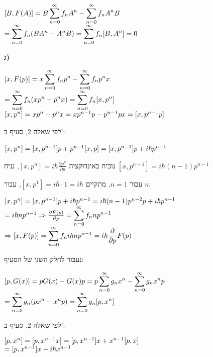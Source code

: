 \documentclass[14pt]{extarticle}
\makeatletter
\newenvironment{lefteqs}{%
    \begin{english}%
    \begin{flushleft}%
    \renewcommand{\arraystretch}{1.3}%
    $\begin{array}{@{}l@{}}%
}{%
    \end{array}$%
    \end{flushleft}%
    \end{english}%
}
\makeatother
\begin{document}
\begin{lefteqs}
    [B,F(A)] = B \displaystyle\sum_{n=0}^\infty f_n A^n  - \displaystyle\sum_{n=0}^\infty f_n A^n B \\
    = \displaystyle\sum_{n=0}^\infty f_n (BA^n - A^nB) = \displaystyle\sum_{n=0}^\infty f_n [B,A^n] = 0
\end{lefteqs}

\textbf{ג)}

\begin{lefteqs}
    [x,F(p)] = x \displaystyle\sum_{n=0}^\infty f_n p^n - \displaystyle\sum_{n=0}^\infty f_n p^n x \\
    = \displaystyle\sum_{n=0}^\infty f_n (xp^n - p^n x) = \displaystyle\sum_{n=0}^\infty f_n [x,p^n] \\
    {}[x,p^n] = xp^n - p^n x = xp^{n-1}p - p^{n-1}px = [x,p^{n-1}p]
\end{lefteqs}
לפי שאלה 2, סעיף ב':
\begin{lefteqs}
    [x,p^n] = [x,p^{n-1}]p + p^{n-1}[x,p] = [x,p^{n-1}]p + i\hbar p^{n-1}
\end{lefteqs}
נוכיח באינדוקציה $[x,p^n] = i\hbar \frac{\partial p^n}{\partial p}$, נניח $[x,p^{n-1}] = i\hbar (n-1)p^{n-1}$

עבור $n=1$, מתקיים $[x,p^1]=i\hbar \cdot 1 = i\hbar$, עבור $n$:

\begin{lefteqs}
    [x,p^n] = [x,p^{n-1}]p + i\hbar p^{n-1} = i\hbar (n-1)p^{n-2}p + i\hbar p^{n-1} \\
    = i\hbar n p^{n-1} \Rightarrow \frac{\partial F(p)}{\partial p} = \displaystyle\sum_{n=0}^\infty f_n n p^{n-1} \\
    \Rightarrow [x,F(p)] = \displaystyle\sum_{n=0}^\infty f_n i\hbar n p^{n-1} = i\hbar \frac{\partial}{\partial p} F(p)
\end{lefteqs}

נעבור לחלק השני של הסעיף:

\begin{lefteqs}
    [p,G(x)] = pG(x) - G(x)p = p \displaystyle\sum_{n=0}^\infty g_n x^n - \displaystyle\sum_{n=0}^\infty g_n x^n p \\
    = \displaystyle\sum_{n=0}^\infty g_n (px^n - x^n p) = \displaystyle\sum_{n=0}^\infty g_n [p,x^n] \\
\end{lefteqs}
לפי שאלה 2, סעיף ב':
\begin{lefteqs}
    [p,x^n] = [p,x^{n-1}x] = [p,x^{n-1}]x + x^{n-1}[p,x] \\
    = [p,x^{n-1}]x - i\hbar x^{n-1}
\end{lefteqs}
\end{document}
